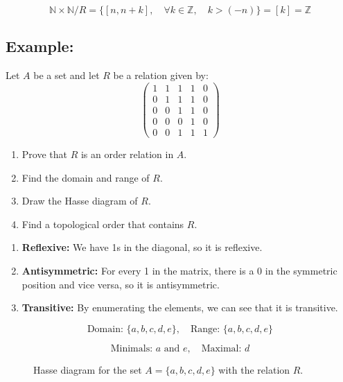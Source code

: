 \documentclass[11pt]{article}
\begin{document}
\[
\mathbb{N} \times \mathbb{N}/R = \{[n,n+k], \quad \forall k \in \mathbb{Z}, \quad k > (-n)\} = [k] = \mathbb{Z}
\]

\subsection*{Example:}
Let $A$ be a set and let $R$ be a relation given by:
\[
    \renewcommand{\arraystretch}{1} %
\begin{pmatrix}
    1 & 1 & 1 & 1 & 0 \\
    0 & 1 & 1 & 1 & 0 \\
    0 & 0 & 1 & 1 & 0 \\
    0 & 0 & 0 & 1 & 0 \\
    0 & 0 & 1 & 1 & 1
\end{pmatrix}
\]

\begin{enumerate}
    \item Prove that $R$ is an order relation in $A$.
    \item Find the domain and range of $R$.
    \item Draw the Hasse diagram of $R$.
    \item Find a topological order that contains $R$.
\end{enumerate}

\begin{enumerate}
    \item \textbf{Reflexive:} We have 1s in the diagonal, so it is reflexive.
    \item \textbf{Antisymmetric:} For every 1 in the matrix, there is a 0 in the symmetric position and vice versa, so it is antisymmetric.
    \item \textbf{Transitive:} By enumerating the elements, we can see that it is transitive.
\end{enumerate}

\[
\text{Domain: } \{a,b,c,d,e\}, \quad \text{Range: } \{a,b,c,d,e\}
\]

\[
\text{Minimals: } a \text{ and } e, \quad \text{Maximal: } d
\]

\begin{figure}[h]
    \centering
    \caption{Hasse diagram for the set $A = \{a,b,c,d,e\}$ with the relation $R$.}
    \label{fig:hasse_relation}
\end{figure}
\end{document}
